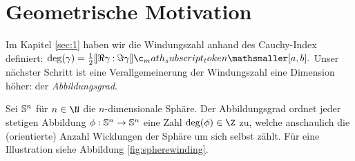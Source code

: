 \documentclass{mythesis}
\begin{document}
\section{Geometrische Motivation}


Im Kapitel \ref{sec:1} haben wir die Windungszahl anhand des Cauchy-Index definiert:
\begin{math}
    \deg(\gamma) = \frac{1}{2} \Index{[a,b]}{\Re \gamma}{\Im \gamma}.
\end{math}
Unser nächster Schritt ist eine Verallgemeinerung der Windungszahl eine Dimension höher: der \emph{Abbildungsgrad}.

Sei $\S^n$ für $n \in \N$ die $n$-dimensionale Sphäre.
Der Abbildungsgrad ordnet jeder stetigen Abbildung $\phi: \S^n \to \S^n$ eine Zahl $\deg(\phi) \in \Z$ zu, welche anschaulich die (orientierte) Anzahl Wicklungen der Sphäre um sich selbst zählt.
Für eine Illustration siehe Abbildung \ref{fig:spherewinding}.
\end{document}
